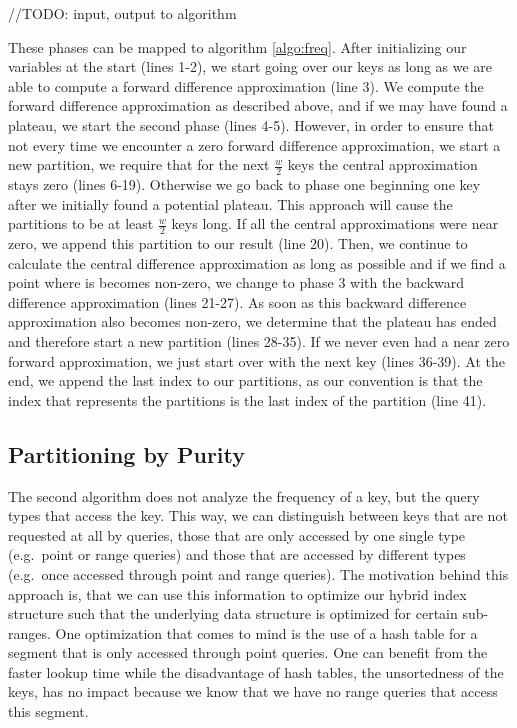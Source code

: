 //TODO: input, output to algorithm

These phases can be mapped to algorithm \ref{algo:freq}. After initializing our variables at the start (lines 1-2), we start going over our keys as long as we are able to compute a forward difference approximation (line 3). We compute the forward difference approximation as described above, and if we may have found a plateau, we start the second phase (lines 4-5). However, in order to ensure that not every time we encounter a zero forward difference approximation, we start a new partition, we require that for the next $\frac{w}{2}$ keys the central approximation stays zero (lines 6-19). Otherwise we go back to phase one beginning one key after we initially found a potential plateau. This approach will cause the partitions to be at least $\frac{w}{2}$ keys long. If all the central approximations were near zero, we append this partition to our result (line 20). Then, we continue to calculate the central difference approximation as long as possible and if we find a point where is becomes non-zero, we change to phase 3 with the backward difference approximation (lines 21-27). As soon as this backward difference approximation also becomes non-zero, we determine that the plateau has ended and therefore start a new partition (lines 28-35). If we never even had a near zero forward approximation, we just start over with the next key (lines 36-39). At the end, we append the last index to our partitions, as our convention is that the index that represents the partitions is the last index of the partition (line 41).

\subsection{Partitioning by Purity} \label{sec:purity}
The second algorithm does not analyze the frequency of a key, but the query types that access the key. This way, we can distinguish between keys that are not requested at all by queries, those that are only accessed by one single type (e.g.~point or range queries) and those that are accessed by different types (e.g.~once accessed through point and range queries). The motivation behind this approach is, that we can use this information to optimize our hybrid index structure such that the underlying data structure is optimized for certain sub-ranges. One optimization that comes to mind is the use of a hash table for a segment that is only accessed through point queries. One can benefit from the faster lookup time while the disadvantage of hash tables, the unsortedness of the keys, has no impact because we know that we have no range queries that access this segment.

